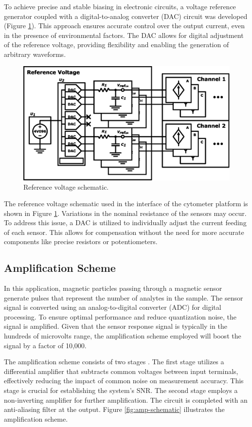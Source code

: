 To achieve precise and stable biasing in electronic circuits, a voltage reference generator coupled with a digital-to-analog converter (DAC) circuit was developed (Figure \ref{fig:vref-schematic}). This approach \cite{Germano2006MICROSYSTEMFB} ensures accurate control over the output current, even in the presence of environmental factors. The DAC allows for digital adjustment of the reference voltage, providing flexibility and enabling the generation of arbitrary waveforms.

\begin{figure}[!ht]
    \centering
    \includegraphics[width=.475\textwidth]{figs/vref.eps}
    \caption{Reference voltage schematic.}
    \label{fig:vref-schematic}
\end{figure}

The reference voltage schematic used in the interface of the cytometer platform is shown in Figure \ref{fig:vref-schematic}. Variations in the nominal resistance of the sensors may occur. To address this issue, a DAC is utilized to individually adjust the current feeding of each sensor. This allows for compensation without the need for more accurate components like precise resistors or potentiometers.

\subsection{Amplification Scheme}

In this application, magnetic particles passing through a magnetic sensor generate pulses that represent the number of analytes in the sample. The sensor signal is converted using an analog-to-digital converter (ADC) for digital processing. To ensure optimal performance and reduce quantization noise, the signal is amplified. Given that the sensor response signal is typically in the hundreds of microvolts range, the amplification scheme employed will boost the signal by a factor of 10,000.

The amplification scheme consists of two stages \cite{TIM.2013.2296417}. The first stage utilizes a differential amplifier that subtracts common voltages between input terminals, effectively reducing the impact of common noise on measurement accuracy. This stage is crucial for establishing the system's SNR. The second stage employs a non-inverting amplifier for further amplification. The circuit is completed with an anti-aliasing filter at the output. Figure \ref{fig:amp-schematic} illustrates the amplification scheme.

